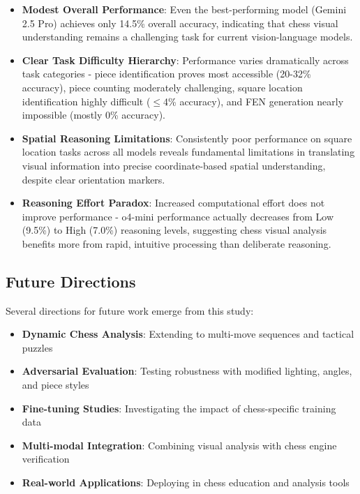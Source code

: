 \documentclass{article}
\begin{document}
\begin{itemize}
    \item \textbf{Modest Overall Performance}: Even the best-performing model (Gemini 2.5 Pro) achieves only 14.5\% overall accuracy, indicating that chess visual understanding remains a challenging task for current vision-language models.
    
    \item \textbf{Clear Task Difficulty Hierarchy}: Performance varies dramatically across task categories - piece identification proves most accessible (20-32\% accuracy), piece counting moderately challenging, square location identification highly difficult ($\leq$4\% accuracy), and FEN generation nearly impossible (mostly 0\% accuracy).
    
    \item \textbf{Spatial Reasoning Limitations}: Consistently poor performance on square location tasks across all models reveals fundamental limitations in translating visual information into precise coordinate-based spatial understanding, despite clear orientation markers.
    
    \item \textbf{Reasoning Effort Paradox}: Increased computational effort does not improve performance - o4-mini performance actually decreases from Low (9.5\%) to High (7.0\%) reasoning levels, suggesting chess visual analysis benefits more from rapid, intuitive processing than deliberate reasoning.
\end{itemize}

\subsection{Future Directions}

Several directions for future work emerge from this study:

\begin{itemize}
    \item \textbf{Dynamic Chess Analysis}: Extending to multi-move sequences and tactical puzzles
    \item \textbf{Adversarial Evaluation}: Testing robustness with modified lighting, angles, and piece styles
    \item \textbf{Fine-tuning Studies}: Investigating the impact of chess-specific training data
    \item \textbf{Multi-modal Integration}: Combining visual analysis with chess engine verification
    \item \textbf{Real-world Applications}: Deploying in chess education and analysis tools
\end{itemize}
\end{document}
